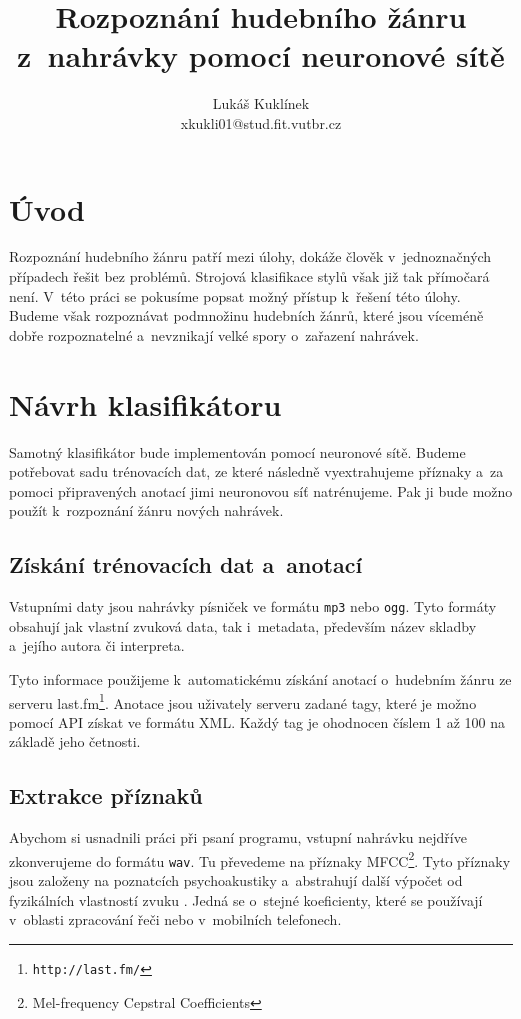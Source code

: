 \documentclass[10pt,a4paper,twocolumn]{article}
\title{Rozpoznání hudebního žánru z~nahrávky pomocí neuronové sítě}
\author{Lukáš Kuklínek\\xkukli01@stud.fit.vutbr.cz}
\date{}
\begin{document}
\maketitle

\section{Úvod}

Rozpoznání hudebního žánru patří mezi úlohy, dokáže člověk v~jednoznačných případech řešit bez problémů.
Strojová klasifikace stylů však již tak přímočará není.
V~této práci se pokusíme popsat možný přístup k~řešení této úlohy.
Budeme však rozpoznávat podmnožinu hudebních žánrů, které jsou víceméně dobře rozpoznatelné
a~nevznikají velké spory o~zařazení nahrávek.

\section{Návrh klasifikátoru}

Samotný klasifikátor bude implementován pomocí neuronové sítě.
Budeme potřebovat sadu trénovacích dat, ze které následně vyextrahujeme příznaky
a~za pomoci připravených anotací jimi neuronovou síť natrénujeme.
Pak ji bude možno použít k~rozpoznání žánru nových nahrávek.

\subsection{Získání trénovacích dat a~anotací}

Vstupními daty jsou nahrávky písniček ve formátu \verb|mp3| nebo \verb|ogg|.
Tyto formáty obsahují jak vlastní zvuková data, tak i~metadata, především název
skladby a~jejího autora či interpreta.

Tyto informace použijeme k~automatickému získání anotací
o~hudebním žánru ze serveru last.fm\footnote{\texttt{http://last.fm/}}.
Anotace jsou uživately serveru zadané tagy, které je možno pomocí API získat ve formátu XML.
Každý tag je ohodnocen číslem 1 až 100 na základě jeho četnosti.

\subsection{Extrakce příznaků}

Abychom si usnadnili práci při psaní programu,
vstupní nahrávku nejdříve zkonverujeme do formátu \verb|wav|.
Tu převedeme na příznaky MFCC\footnote{Mel-frequency Cepstral Coefficients}.
Tyto příznaky jsou založeny na poznatcích psychoakustiky a~abstrahují
další výpočet od fyzikálních vlastností zvuku \cite{mfcc}.
Jedná se o~stejné koeficienty, které se používají v~oblasti zpracování řeči
nebo v~mobilních telefonech.
\end{document}
